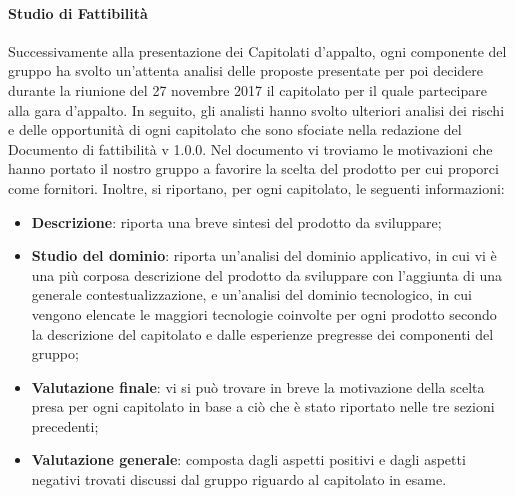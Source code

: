 \paragraph{Studio di Fattibilità}\Spazio
Successivamente alla presentazione dei Capitolati d'appalto, ogni componente del gruppo ha svolto un'attenta analisi delle proposte presentate per poi decidere durante la riunione del 27 novembre 2017 il capitolato per il quale partecipare alla gara d'appalto. In seguito, gli analisti hanno svolto ulteriori analisi dei rischi e delle opportunità di ogni capitolato che sono sfociate nella redazione del Documento di fattibilità v 1.0.0. Nel documento vi troviamo le motivazioni che hanno portato il nostro gruppo a favorire la scelta del prodotto per cui proporci come fornitori. Inoltre, si riportano, per ogni capitolato, le seguenti informazioni:
\begin{itemize}
 	\item\textbf{{Descrizione}}: riporta una breve sintesi del prodotto da sviluppare;
 	\item\textbf{{Studio del dominio}}: riporta un'analisi del dominio applicativo, in cui vi è una più corposa descrizione del prodotto da sviluppare con l'aggiunta di una generale contestualizzazione, e un'analisi del dominio tecnologico, in cui vengono elencate le maggiori tecnologie coinvolte per ogni prodotto secondo la descrizione del capitolato e dalle esperienze pregresse dei componenti del gruppo;
 	\item\textbf{{Valutazione finale}}: vi si può trovare in breve la motivazione della scelta presa per ogni capitolato in base a ciò che è stato riportato nelle tre sezioni precedenti;
 	\item\textbf{{Valutazione generale}}: composta dagli aspetti positivi e dagli aspetti negativi trovati discussi dal gruppo riguardo al capitolato in esame.
\end{itemize}
\pagebreak
